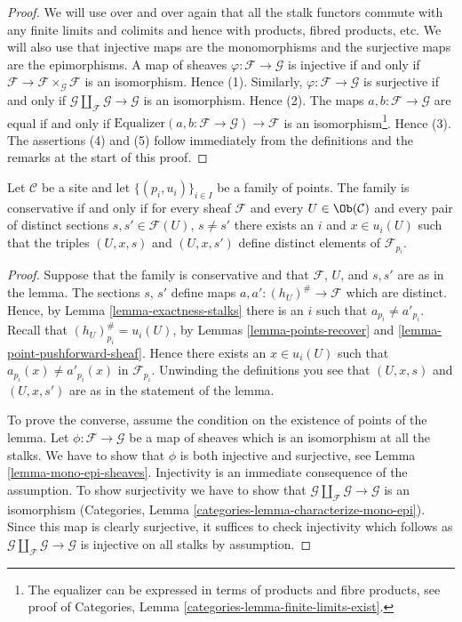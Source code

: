 \begin{proof}
We will use over and over again that all the stalk functors commute
with any finite limits and colimits and hence with products, fibred
products, etc. We will also use that injective maps are the monomorphisms
and the surjective maps are the epimorphisms.
A map of sheaves $\varphi : \mathcal{F} \to \mathcal{G}$
is injective if and only if
$\mathcal{F} \to \mathcal{F} \times_\mathcal{G} \mathcal{F}$
is an isomorphism. Hence (1).
Similarly, $\varphi : \mathcal{F} \to \mathcal{G}$
is surjective if and only if
$\mathcal{G} \amalg_\mathcal{F} \mathcal{G} \to \mathcal{G}$
is an isomorphism. Hence (2).
The maps $a, b : \mathcal{F} \to \mathcal{G}$
are equal if and only if
$\text{Equalizer}(a, b : \mathcal{F} \to \mathcal{G}) \to \mathcal{F}$
is an isomorphism\footnote{The equalizer can be expressed
in terms of products and fibre products, see proof of
Categories, Lemma \ref{categories-lemma-finite-limits-exist}.}. Hence (3).
The assertions (4) and (5) follow immediately from the definitions
and the remarks at the start of this proof.
\end{proof}

\begin{lemma}
\label{lemma-enough}
Let $\mathcal{C}$ be a site and let $\{(p_i, u_i)\}_{i\in I}$ be a
family of points. The family is conservative if and only if for every
sheaf $\mathcal{F}$ and every $U\in \Ob(\mathcal{C})$ and every
pair of distinct sections $s, s' \in \mathcal{F}(U)$, $s \not = s'$ there
exists an $i$ and $x\in u_i(U)$ such that the triples
$(U, x, s)$ and $(U, x, s')$ define distinct elements of
$\mathcal{F}_{p_i}$.
\end{lemma}

\begin{proof}
Suppose that the family is conservative and that $\mathcal{F}$, $U$, and
$s, s'$ are as in the lemma. The sections $s$, $s'$ define maps
$a, a' : (h_U)^\# \to \mathcal{F}$ which are distinct. Hence, by Lemma
\ref{lemma-exactness-stalks} there is an $i$ such that $a_{p_i}
\not = a'_{p_i}$. Recall that $(h_U)^\#_{p_i} = u_i(U)$, by
Lemmas \ref{lemma-points-recover} and
\ref{lemma-point-pushforward-sheaf}.
Hence there exists an $x \in u_i(U)$ such that $a_{p_i}(x)
\not = a'_{p_i}(x)$ in $\mathcal{F}_{p_i}$.
Unwinding the definitions you see that $(U, x, s)$
and $(U, x, s')$ are as in the statement of the lemma.

\medskip\noindent
To prove the converse, assume the condition on the existence of
points of the lemma. Let $\phi : \mathcal{F} \to \mathcal{G}$
be a map of sheaves which is an isomorphism at all the stalks.
We have to show that $\phi$ is both
injective and surjective, see Lemma \ref{lemma-mono-epi-sheaves}.
Injectivity is an immediate consequence of the assumption.
To show surjectivity we have to show that
$\mathcal{G} \amalg_\mathcal{F} \mathcal{G} \to \mathcal{G}$
is an isomorphism
(Categories, Lemma \ref{categories-lemma-characterize-mono-epi}).
Since this map is clearly surjective, it suffices to check injectivity
which follows as $\mathcal{G} \amalg_\mathcal{F} \mathcal{G} \to \mathcal{G}$
is injective on all stalks by assumption.
\end{proof}

